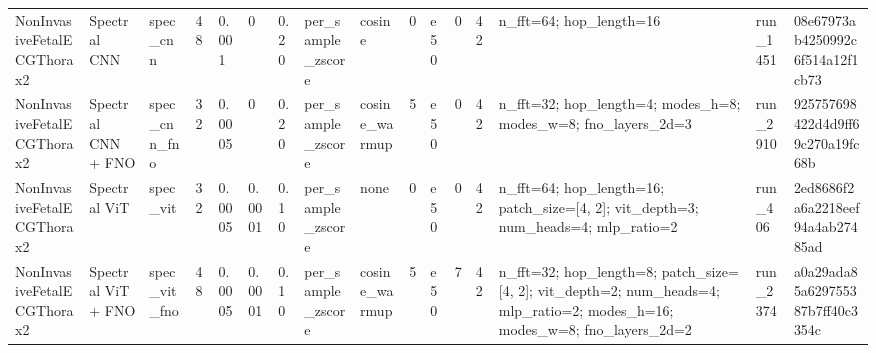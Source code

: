 \begin{table}
\begin{tabular}{llllllllllllllll}
NonInvasiveFetalECGThorax2 & Spectral CNN & spec\_cnn & 48 & 0.001 & 0 & 0.20 & per\_sample\_zscore & cosine & 0 & e50 & 0 & 42 & n\_fft=64; hop\_length=16 & run\_1451 & 08e67973ab4250992c6f514a12f1cb73 \\
NonInvasiveFetalECGThorax2 & Spectral CNN + FNO & spec\_cnn\_fno & 32 & 0.0005 & 0 & 0.20 & per\_sample\_zscore & cosine\_warmup & 5 & e50 & 0 & 42 & n\_fft=32; hop\_length=4; modes\_h=8; modes\_w=8; fno\_layers\_2d=3 & run\_2910 & 925757698422d4d9ff69c270a19fc68b \\
NonInvasiveFetalECGThorax2 & Spectral ViT & spec\_vit & 32 & 0.0005 & 0.0001 & 0.10 & per\_sample\_zscore & none & 0 & e50 & 0 & 42 & n\_fft=64; hop\_length=16; patch\_size=[4, 2]; vit\_depth=3; num\_heads=4; mlp\_ratio=2 & run\_406 & 2ed8686f2a6a2218eef94a4ab27485ad \\
NonInvasiveFetalECGThorax2 & Spectral ViT + FNO & spec\_vit\_fno & 48 & 0.0005 & 0.0001 & 0.10 & per\_sample\_zscore & cosine\_warmup & 5 & e50 & 7 & 42 & n\_fft=32; hop\_length=8; patch\_size=[4, 2]; vit\_depth=2; num\_heads=4; mlp\_ratio=2; modes\_h=16; modes\_w=8; fno\_layers\_2d=2 & run\_2374 & a0a29ada85a629755387b7ff40c3354c \\
\bottomrule
\end{tabular}
\end{table}
